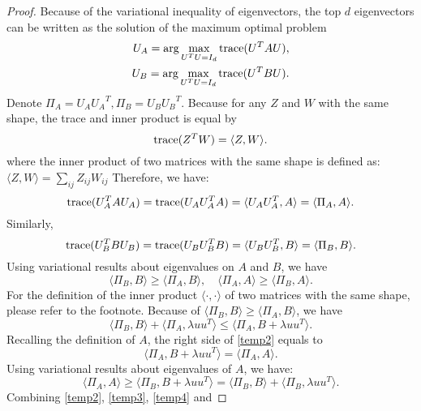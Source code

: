 \documentclass[aos,preprint]{imsart}
\theoremstyle{remark}
\begin{document}
\begin{appendix}
\begin{proof}\label{Rank-one Enlarge Projection}
Because of the variational inequality of eigenvectors, the top $d$ eigenvectors can be written as the solution of the maximum optimal problem
 \[
 \begin{aligned}
U_A = \arg\max_{U^TU = I_d} {\rm trace} (U^T A U),\\
U_B = \arg\max_{U^TU = I_d} {\rm trace} (U^T B U).
\end{aligned}
\]
Denote $\Pi_A = U_A {U_A}^T,  \Pi_B = U_B {U_B}^T$. Because for any $Z$ and $W$ with the same shape, the trace and inner product is equal  by 
\[
{\rm trace} (Z^TW) = \langle Z, W\rangle.
\]
where the inner product of two matrices with the same shape is defined as:
$
\langle Z,W \rangle = \sum_{ij} Z_{ij} W_{ij}
$
Therefore, we have:
\[
{\rm trace} (U_A^T A U_A) = {\rm trace} (U_A U_A^T A ) =\langle U_AU_A^T, A\rangle = \langle  \Pi_A, A\rangle.
\]
Similarly, 
\[
{\rm trace} (U_B^T B U_B) = {\rm trace} (U_B U_B^T B ) =\langle U_BU_B^T, B\rangle = \langle  \Pi_B, B\rangle.
\]
Using variational results about eigenvalues on $A$ and $B$, we have 
\begin{equation}\label{variantional}
\langle \Pi_B , B \rangle \geq \langle \Pi_A , B \rangle,  \quad \langle \Pi_A , A \rangle \geq \langle \Pi_B , A \rangle.
\end{equation}
For the definition of the inner product $\langle \cdot, \cdot \rangle$ of two matrices with the same shape, please refer to the footnote. Because of $\langle \Pi_B , B \rangle \geq \langle \Pi_A , B \rangle$, we have
\begin{equation}\label{temp2}
\langle \Pi_B, B\rangle+ \langle \Pi_A, \lambda uu^T\rangle \leq \langle \Pi_A, B+\lambda uu^T \rangle.
\end{equation}
Recalling the definition of $A$, the right side of \eqref{temp2} equals to
\begin{equation}\label{temp3}
\langle \Pi_A, B+\lambda uu^T \rangle = \langle \Pi_A , A \rangle.
\end{equation}
Using variational results about eigenvalues of $A$, we have:
\begin{equation}\label{temp4}
\langle \Pi_A , A \rangle \geq  \langle \Pi_B, B+\lambda uu^T \rangle=\langle \Pi_B, B\rangle + \langle \Pi_B, \lambda uu^T \rangle.
\end{equation}
Combining \eqref{temp2}, \eqref{temp3}, \eqref{temp4} and

\end{proof}
\end{appendix}
\end{document}
